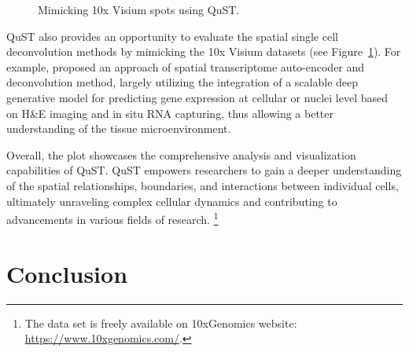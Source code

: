 \documentclass{article}
\begin{document}
\begin{figure}[htp]
	\centering
	\hfill
	\caption{Mimicking 10x Visium spots using QuST.}
	\label{fig:result3}
\end{figure}

QuST also provides an opportunity to evaluate the spatial single cell deconvolution methods by mimicking the 10x Visium datasets (see Figure~\ref{fig:result3}). For example, \cite{Huang:2023a} proposed an approach of spatial transcriptome auto-encoder and deconvolution method, largely utilizing the integration of a scalable deep generative model for predicting gene expression at cellular or nuclei level based on H\&E imaging and in situ RNA capturing, thus allowing a better understanding of the tissue microenvironment. 

Overall, the plot showcases the comprehensive analysis and visualization capabilities of QuST. QuST empowers researchers to gain a deeper understanding of the spatial relationships, boundaries, and interactions between individual cells, ultimately unraveling complex cellular dynamics and contributing to advancements in various fields of research. \footnote{The data set is freely available on 10xGenomics website: \url{https://www.10xgenomics.com/}.}

\section{Conclusion}
\end{document}
